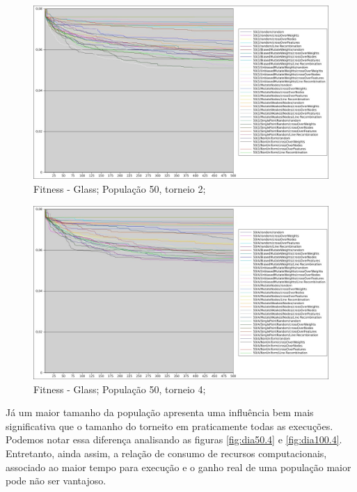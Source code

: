 \documentclass[12pt]{article}
\begin{document}
\begin{figure}[htp]
\center
\includegraphics[scale=0.4, keepaspectratio]{glass_50_2.jpg} 
\caption{Fitness - Glass; População 50, torneio 2;}
\label{fig:gla50.2}
\end{figure}

\begin{figure}[hbp]
\center
\includegraphics[scale=0.4, keepaspectratio]{glass_50_4.jpg} 
\caption{Fitness - Glass; População 50, torneio 4;}
\label{fig:gla50.4}
\end{figure}

Já um maior tamanho da população apresenta uma influência bem mais significativa que o tamanho do torneito em praticamente todas as execuções. Podemos notar essa diferença analisando as figuras \ref{fig:dia50.4} e \ref{fig:dia100.4}. Entretanto, ainda assim, a relação de consumo de recursos computacionais, associado ao maior tempo para execução e o ganho real de uma população maior pode não ser vantajoso.
\end{document}
